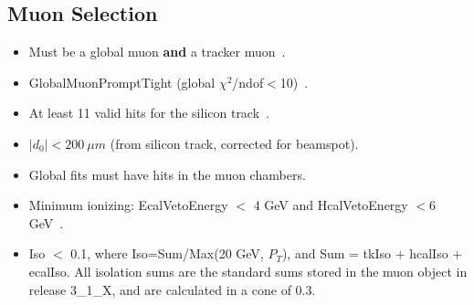 \subsection{Muon Selection}
\label{sec:muon}
\begin{itemize}
\item Must be a global muon {\bf and} a tracker muon~\cite{glbtrk}.
\item GlobalMuonPromptTight (global $\chi^2$/ndof$<$10)~\cite{muonid}.
\item At least 11 valid hits for the silicon track~\cite{muonid}.
\item $|d_0| < 200~\mu m$ (from silicon track, corrected for beamspot).
\item Global fits must have hits in the muon chambers.
\item Minimum ionizing: EcalVetoEnergy $<$ 4 GeV and HcalVetoEnergy $<6$ GeV~\cite{vplusj}. 
\item Iso $<$ 0.1, where Iso=Sum/Max(20 GeV, $P_T$), and Sum = tkIso + hcalIso +  ecalIso.
All isolation sums are the standard sums stored in the muon object in release 3\_1\_X, and
are calculated in a cone of 0.3.
\end{itemize}


